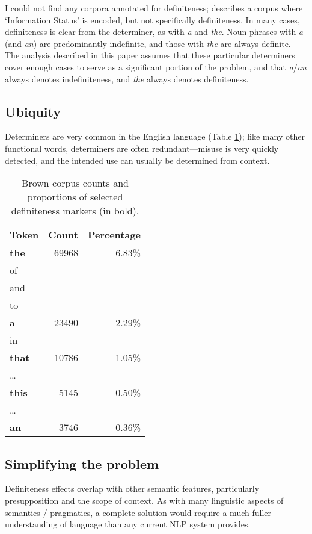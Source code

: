 \documentclass[11pt]{article}
\begin{document}
I could not find any corpora annotated for definiteness; \citet{calhoun:2010} describes a corpus where `Information Status' is encoded, but not specifically definiteness.
In many cases, definiteness is clear from the determiner, as with \emph{a} and \emph{the}. Noun phrases with \emph{a} (and \emph{an}) are predominantly indefinite, and those with \emph{the} are always definite. The analysis described in this paper assumes that these particular determiners cover enough cases to serve as a significant portion of the problem, and that \emph{a}/\emph{an} always denotes indefiniteness, and \emph{the} always denotes definiteness.


\subsection{Ubiquity}
Determiners are very common in the English language (Table \ref{tab:browncounts}); like many other functional words, determiners are often redundant---misuse is very quickly detected, and the intended use can usually be determined from context.
\begin{table}[H]
  \centering
  \begin{tabular}{lrr}
    Token & Count & Percentage\\
    \toprule
    \textbf{the} & 69968 & 6.83\% \\
    of & &\\%
    and & &\\%
    to & &\\%
    \textbf{a} & 23490 & 2.29\% \\
    in & &\\%
    \textbf{that} & 10786 & 1.05\% \\
    \dots &       &          \\
    \textbf{this} & 5145 & 0.50\% \\
    \dots &       &          \\
    \textbf{an} & 3746 & 0.36\% \\
  \end{tabular}
  \caption{Brown corpus counts and proportions of selected definiteness markers (in bold).}
  \label{tab:browncounts}
\end{table}

\subsection{Simplifying the problem}
Definiteness effects overlap with other semantic features, particularly presupposition and the scope of context. As with many linguistic aspects of semantics / pragmatics, a complete solution would require a much fuller understanding of language than any current NLP system provides.
\end{document}
